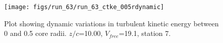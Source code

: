 \begin{figure}[H]
\centering
\texttt{[image: figs/run\_63/run\_63\_ctke\_005rdynamic]}
\caption{Plot showing dynamic variations in turbulent kinetic energy between 0 and 0.5 core radii. $z/c$=10.00, $V_{free}$=19.1, station 7.}
\label{fig:run_63_ctke_005rdynamic}
\end{figure}


